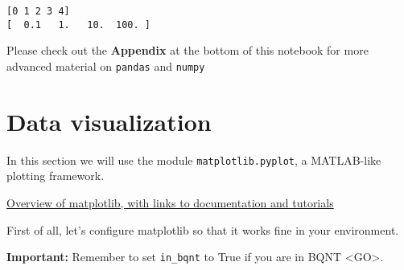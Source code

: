 \documentclass[8pt]{extarticle}
\begin{document}
    \begin{Verbatim}[commandchars=\\\{\}]
[0 1 2 3 4]
[  0.1   1.   10.  100. ]

    \end{Verbatim}

    Please check out the \textbf{Appendix} at the bottom of this notebook
for more advanced material on \texttt{pandas} and \texttt{numpy}

    \section{Data visualization}\label{data-visualization}

In this section we will use the module \texttt{matplotlib.pyplot}, a
MATLAB-like plotting framework.

\href{http://nbviewer.jupyter.org/github/matplotlib/AnatomyOfMatplotlib/blob/master/AnatomyOfMatplotlib-Part1-Figures_Subplots_and_layouts.ipynb}{Overview
of matplotlib, with links to documentation and tutorials}

First of all, let's configure matplotlib so that it works fine in your
environment.

\textbf{Important:} Remember to set \texttt{in\_bqnt} to True if you are
in BQNT \textless{}GO\textgreater{}.
\end{document}
